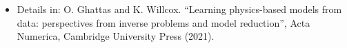 \documentclass[10pt,final,xcolor=dvipsnames]{beamer}
\begin{document}
\begin{frame}
  \vspace{0.15in}
  \begin{itemize}
  \item [] \scriptsize{Details in: O. Ghattas and
    K. Willcox. ``Learning physics-based models from data:
    perspectives from inverse problems and model reduction'', Acta
    Numerica, Cambridge University Press (2021).}
  \end{itemize}


\end{frame}
%
\end{document}

